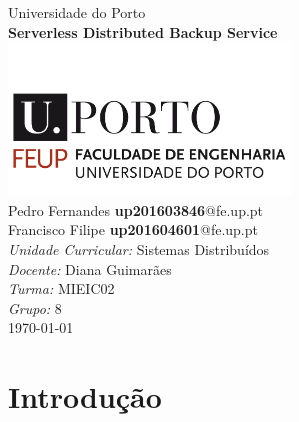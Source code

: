 \documentclass[11pt,oneside]{book}
\begin{document}
\begin{titlepage}

\begin{center}
{\LARGE Universidade do Porto}\\[1.5cm]
\linespread{1.2}\huge {\bfseries Serverless Distributed Backup Service}\\[1.5cm]
\linespread{1}
\includegraphics[width=7.5cm]{feup.png}\\[1cm]
{\large Pedro Fernandes \textbf{up201603846}@fe.up.pt}\\
{\large Francisco Filipe \textbf{up201604601}@fe.up.pt}\\[1cm]
{\large \emph{Unidade Curricular:} Sistemas Distribuídos}\\
{\large \emph{Docente:} Diana Guimarães}\\
{\large \emph{Turma:} MIEIC02}\\
{\large \emph{Grupo:} 8}\\[2cm]

\large \today
\end{center}

\end{titlepage}


\doublespacing
\tableofcontents
\singlespacing


\mainmatter

\section{Introdução}
\end{document}

